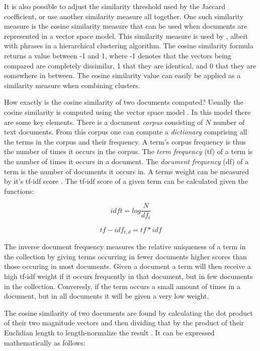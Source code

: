 It is also possible to adjust the similarity threshold used by the Jaccard coefficient, or use another similarity measure all together. One such similarity measure is the cosine similarity measure that can be used when documents are represented in a vector space model. This similarity measure is used by \cite{Chim2007}, albeit with phrases in a hierarchical clustering algorithm. The cosine similarity formula returns a value between -1 and 1, where -1 denotes that the vectors being compared are completely dissimilar, 1 that they are identical, and 0 that they are somewhere in between. The cosine similarity value can easily be applied as a similarity measure when combining clusters.

How exactly is the cosine similarity of two documents computed? Usually the cosine similarity is computed using the vector space model \cite{Manning2009a}. In this model there are some key elements. There is a document \textit{corpus} consisting of \(N\) number of text documents. From this corpus one can compute a \textit{dictionary} comprising all the terms in the corpus and their frequency. A term's corpus frequency is thus the number of times it occurs in the corpus. The \textit{term frequency} (tf) of a term is the number of times it occurs in a document. The \textit{document frequency} (df) of a term is the number of documents it occurs in. A terms weight can be measured by it's tf-idf score \cite{Manning2009a}. The tf-idf score of a given term can be calculated given the functions:


\begin{displaymath}
idf{t} = log \frac{N}{df_{t}} 
\end{displaymath}

\begin{displaymath}
tf-idf_{t,d} = tf * idf
\end{displaymath}

The inverse document frequency measures the relative uniqueness of a term in the collection by giving terms occurring in fewer documents higher scores than those occuring in most documents. Given a document a term will then receive a high tf-idf weight if it occurs frequently in that document, but in few documents in the collection. Converesly, if the term occurs a small amount of times in a document, but in all documents it will be given a very low weight.

The cosine similarity of two documents are found by calculating the dot product of their two magnitude vectors and then dividing that by the product of their Euclidian length to length-normalize the result \cite{Manning2009a}. It can be expressed mathematically as follows:

